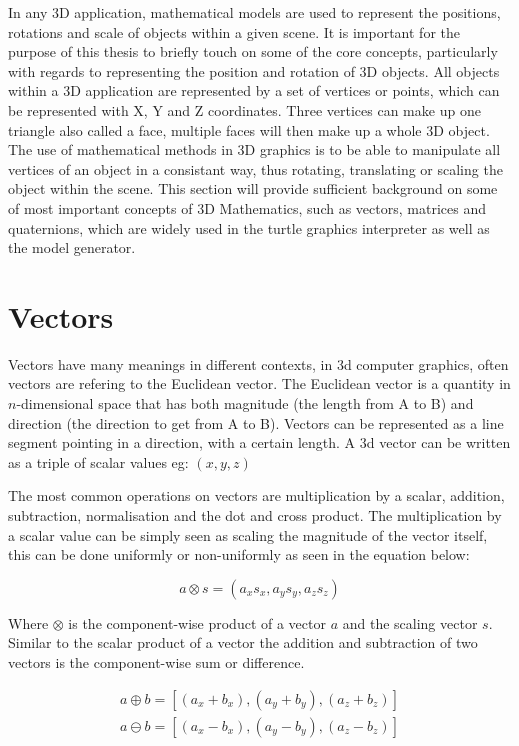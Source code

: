 
In any 3D application, mathematical models are used to represent the positions, rotations and scale of objects within a given scene. It is important for the purpose of this thesis to briefly touch on some of the core concepts, particularly with regards to representing the position and rotation of 3D objects. All objects within a 3D application are represented by a set of vertices or points, which can be represented with X, Y and Z coordinates. Three vertices can make up one triangle also called a face, multiple faces will then make up a whole 3D object. The use of mathematical methods in 3D graphics is to be able to manipulate all vertices of an object in a consistant way, thus rotating, translating or scaling the object within the scene. This section will provide sufficient background on some of most important concepts of 3D Mathematics, such as vectors, matrices and quaternions, which are widely used in the turtle graphics interpreter as well as the model generator.

\section{Vectors}

Vectors have many meanings in different contexts, in \acrshort{3d} computer graphics, often vectors are refering to the Euclidean vector. The Euclidean vector is a quantity in $n$-dimensional space that has both magnitude (the length from A to B) and direction (the direction to get from A to B). Vectors can be represented as a line segment pointing in a direction, with a certain length. A \acrshort{3d} vector can be written as a triple of scalar values eg: $(x, y, z)$

The most common operations on vectors are multiplication by a scalar, addition, subtraction, normalisation and the dot and cross product. The multiplication by a scalar value can be simply seen as scaling the magnitude of the vector itself, this can be done uniformly or non-uniformly as seen in the equation below:

\begin{equation}
a \otimes s = (a_x s_x, a_y s_y, a_z s_z)
\end{equation}

\noindent
Where $\otimes$ is the component-wise product of a vector $a$ and the scaling vector $s$. Similar to the scalar product of a vector the addition and subtraction of two vectors is the component-wise sum or difference. 

\begin{equation}
\begin{aligned}
a \oplus b = [(a_x + b_x), (a_y + b_y), (a_z + b_z)]\\
a \ominus b = [(a_x - b_x), (a_y - b_y), (a_z - b_z)]
\end{aligned}
\end{equation}

